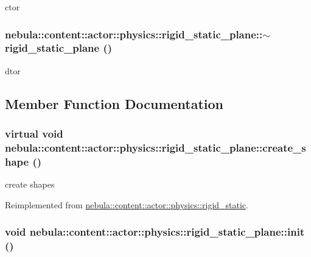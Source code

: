 ctor \hypertarget{classnebula_1_1content_1_1actor_1_1physics_1_1rigid__static__plane_a961a69e85f5169130857f5ad9dd135fd}{
\subsubsection[{$\sim$rigid\_\-static\_\-plane}]{\setlength{\rightskip}{0pt plus 5cm}nebula::content::actor::physics::rigid\_\-static\_\-plane::$\sim$rigid\_\-static\_\-plane ()}}
\label{classnebula_1_1content_1_1actor_1_1physics_1_1rigid__static__plane_a961a69e85f5169130857f5ad9dd135fd}


dtor 

\subsection{Member Function Documentation}
\hypertarget{classnebula_1_1content_1_1actor_1_1physics_1_1rigid__static__plane_ae711cbc9bd080a597efd1a5193756152}{
\subsubsection[{create\_\-shape}]{\setlength{\rightskip}{0pt plus 5cm}virtual void nebula::content::actor::physics::rigid\_\-static\_\-plane::create\_\-shape ()}}
\label{classnebula_1_1content_1_1actor_1_1physics_1_1rigid__static__plane_ae711cbc9bd080a597efd1a5193756152}


create shapes 

Reimplemented from \hyperlink{classnebula_1_1content_1_1actor_1_1physics_1_1rigid__static_a0f4319c5cceb75e7d4376b82dba662de}{nebula::content::actor::physics::rigid\_\-static}.\hypertarget{classnebula_1_1content_1_1actor_1_1physics_1_1rigid__static__plane_ae7e418de928a5830a9e088bb843c95f0}{
\subsubsection[{init}]{\setlength{\rightskip}{0pt plus 5cm}void nebula::content::actor::physics::rigid\_\-static\_\-plane::init ()}}
\label{classnebula_1_1content_1_1actor_1_1physics_1_1rigid__static__plane_ae7e418de928a5830a9e088bb843c95f0}


